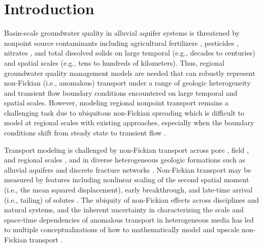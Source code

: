 \section{Introduction}

Basin-scale groundwater quality in alluvial aquifer systems is threatened by nonpoint source contaminants including agricultural fertilizers \citep{Burow2008}, pesticides \citep{Burow2008, Burow1998}, nitrates \citep{Harter2012, henri2019stochastic}, and total dissolved solids \citep{Hansen2018, Lindsey2018} on large temporal (e.g., decades to centuries) and spatial scales (e.g., tens to hundreds of kilometers). Thus, regional groundwater quality management models \citep{Fogg2006} are needed that can robustly represent non-Fickian (i.e., anomalous) transport under a range of geologic heterogeneity and transient flow boundary conditions encountered on large temporal and spatial scales. However, modeling regional nonpoint transport remains a challenging task due to %
ubiquitous non-Fickian spreading which is difficult to model at regional scales with existing approaches, especially when the boundary conditions shift from steady state to transient flow \citep{guo2020adaptive, labolle2001role}.

Transport modeling is challenged by non-Fickian transport across pore \citep{kang2014pore, morales2017stochastic}, field \citep{garabedian1991large, le2008non}, and regional scales \citep{sivakumar2005fractal, henri2019stochastic}, and in diverse heterogeneous geologic formations such as alluvial aquifers \citep{weissmann2002dispersion, labolle2001role, guo2019upscaling} and discrete fracture networks \citep{hyman2015influence, edery2016structural}. Non-Fickian transport may be measured by features including nonlinear scaling of the second spatial moment (i.e., the mean squared displacement), early breakthrough, and late-time arrival (i.e., tailing) of solutes \citep{valocchi1985validity, freyberg1986natural, zhang2007predicting, haggerty2000late}. The ubiquity of non-Fickian effects across disciplines and natural systems, and the inherent uncertainty in characterizing the scale and space-time dependencies of anomalous transport in heterogeneous media has led to multiple conceptualizations of how to mathematically model and upscale non-Fickian transport \citep{neuman2009perspective}.

